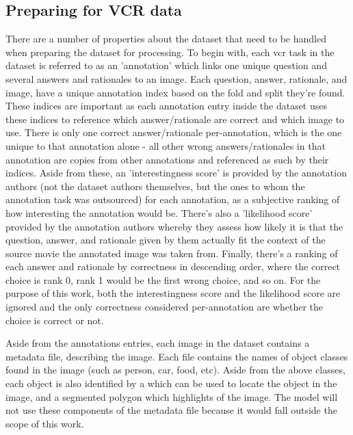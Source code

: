 \subsection{Preparing for VCR data}
\label{subsec:preparing_the_vcr_data}

There are a number of properties about the dataset that need to be handled when preparing the dataset for processing.
To begin with, each \gls{vcr} task in the dataset is referred to as an 'annotation' which links one unique question and several answers and rationales to an image.
Each question, answer, rationale, and image, have a unique annotation index based on the fold and split they're found.
These indices are important as each annotation entry inside the dataset uses these indices to reference which answer/rationale are correct and which image to use.
There is only one correct answer/rationale per-annotation, which is the one unique to that annotation alone - all other wrong answers/rationales in that annotation are copies from other annotations and referenced as such by their indices.
Aside from these, an 'interestingness score' is provided by the annotation authors (not the dataset authors themselves, but the ones to whom the annotation task was outsourced) for each annotation, as a subjective ranking of how interesting the annotation would be.
There's also a 'likelihood score' provided by the annotation authors whereby they assess how likely it is that the question, answer, and rationale given by them actually fit the context of the source movie the annotated image was taken from.
Finally, there's a ranking of each answer and rationale by correctness in descending order, where the correct choice is rank 0, rank 1 would be the first wrong choice, and so on.
For the purpose of this work, both the interestingness score and the likelihood score are ignored and the only correctness considered per-annotation are whether the choice is correct or not.


Aside from the annotations entries, each image in the dataset contains a metadata file, describing the image.
Each file contains the names of object classes found in the image (such as person, car, food, etc).
Aside from the above classes, each object is also identified by a which can be used to locate the object in the image, and a segmented polygon which highlights of the image.
The model will not use these components of the metadata file because it would fall outside the scope of this work.

